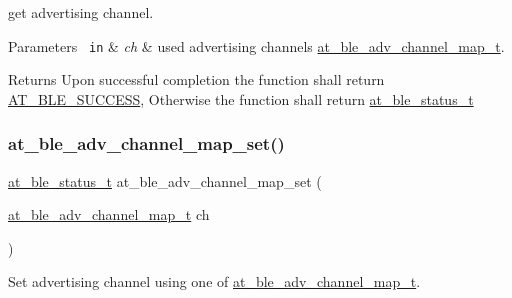 get advertising channel. 


\begin{DoxyParams}[1]{Parameters}
\mbox{\texttt{ in}}  & {\em ch} & used advertising channels \mbox{\hyperlink{at__ble__api_8h_ae3d53ccdbeba291d4765432f6a9d33ca}{at\+\_\+ble\+\_\+adv\+\_\+channel\+\_\+map\+\_\+t}}.\\
\hline
\end{DoxyParams}
\begin{DoxyReturn}{Returns}
Upon successful completion the function shall return \mbox{\hyperlink{group__error__codes__group_gga3b1db9b95feb157b3c188ca27fe76988a7e3bfff5387331cd4f2c56cbcbbd7e19}{A\+T\+\_\+\+B\+L\+E\+\_\+\+S\+U\+C\+C\+E\+SS}}, Otherwise the function shall return \mbox{\hyperlink{at__ble__api_8h_ace24eb4e5ca3f325c663b809da5feb92}{at\+\_\+ble\+\_\+status\+\_\+t}} 
\end{DoxyReturn}
\mbox{\label{group__gap__adv__group_gae3a980a5bd00c7f06ca00a752ef2769b}} 
\subsubsection{\texorpdfstring{at\_ble\_adv\_channel\_map\_set()}{at\_ble\_adv\_channel\_map\_set()}}
{\footnotesize\ttfamily \mbox{\hyperlink{group__error__codes__group_ga3b1db9b95feb157b3c188ca27fe76988}{at\+\_\+ble\+\_\+status\+\_\+t}} at\+\_\+ble\+\_\+adv\+\_\+channel\+\_\+map\+\_\+set (\begin{DoxyParamCaption}\item[{\mbox{\hyperlink{at__ble__api_8h_ae3d53ccdbeba291d4765432f6a9d33ca}{at\+\_\+ble\+\_\+adv\+\_\+channel\+\_\+map\+\_\+t}}}]{ch }\end{DoxyParamCaption})}



Set advertising channel using one of \mbox{\hyperlink{at__ble__api_8h_ae3d53ccdbeba291d4765432f6a9d33ca}{at\+\_\+ble\+\_\+adv\+\_\+channel\+\_\+map\+\_\+t}}. 

